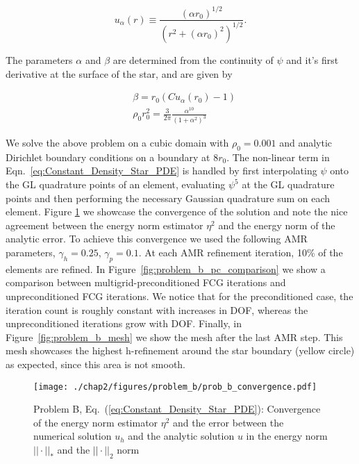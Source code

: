 \begin{equation}
u_{\alpha}(r) \equiv \frac{(\alpha r_0)^{1/2}}{(r^{2} + (\alpha r_0)^{2})^{1/2}}.
\end{equation}

The parameters $\alpha$ and $\beta$ are determined from the continuity of $\psi$ and it's first derivative at the surface of the star, and are given by

\begin{align}
 &\beta = r_0(Cu_{\alpha}(r_0) - 1) \\
 &\rho_{0}r_0^{2} = \frac{3}{2\pi}\frac{\alpha^{10}}{(1+\alpha^{2})^{3}}
\end{align}

We solve the above problem on a cubic domain with $\rho_0 =
0.001$ and analytic Dirichlet boundary conditions on a boundary at
$8r_0$. The non-linear term in Eqn.~\ref{eq:Constant_Density_Star_PDE} is handled by first interpolating $\psi$ onto the GL quadrature points of an element, evaluating $\psi^{5}$ at the GL quadrature points and then performing the necessary Gaussian quadrature sum on each element.
Figure \ref{fig:problem_b_convergence} we showcase the
convergence of the solution and note the nice agreement between the
energy norm estimator $\eta^2$ and the energy norm of the analytic
error. To achieve this convergence we used the following AMR parameters, $\gamma_h = 0.25$, $\gamma_p = 0.1$.  At each AMR refinement iteration, 10\% of the elements are refined. In Figure~\ref{fig:problem_b_pc_comparison} we show a comparison between multigrid-preconditioned FCG iterations and unpreconditioned FCG iterations. We notice that for the preconditioned case, the iteration count is roughly constant with increases in DOF, whereas the unpreconditioned iterations grow with DOF. Finally, in Figure~\ref{fig:problem_b_mesh} we show the mesh after the last AMR step. This mesh showcases the highest h-refinement around the star boundary (yellow circle) as expected, since this area is not smooth. 
 
\begin{figure}[ht!]
  \centering
  \texttt{[image: ./chap2/figures/problem\_b/prob\_b\_convergence.pdf]}
  \caption{Problem B, Eq.~(\ref{eq:Constant_Density_Star_PDE}): Convergence of the energy norm estimator $\eta^2$ and the error between the numerical solution $u_h$ and the analytic solution $u$ in the energy norm $||\cdot||_*$ and the $||\cdot||_2$ norm}
  \label{fig:problem_b_convergence} 
\end{figure}

